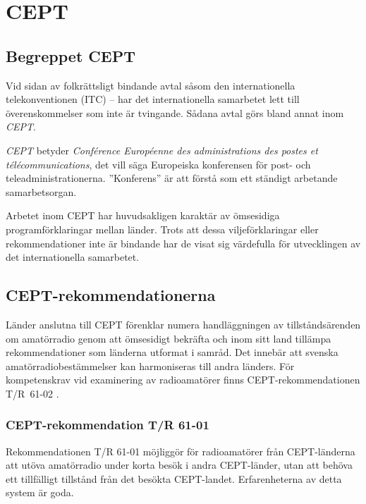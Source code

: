 \section{CEPT}
\label{CEPT}

\subsection{Begreppet CEPT}

Vid sidan av folkrättsligt bindande avtal såsom den internationella
telekonventionen (ITC) -- har det internationella samarbetet lett till
överenskommelser som inte är tvingande.
Sådana avtal görs bland annat inom \emph{CEPT}.

\emph{CEPT} betyder \emph{Conf\'erence Europ\'eenne des administrations des
postes et t\'el\'ecommunications}, det vill säga Europeiska konferensen för
post- och teleadministrationerna.
''Konferens'' är att förstå som ett ständigt arbetande samarbetsorgan.

Arbetet inom CEPT har huvudsakligen karaktär av ömsesidiga programförklaringar
mellan länder.
Trots att dessa viljeförklaringar eller rekommendationer inte är bindande har de
visat sig värdefulla för utvecklingen av det internationella samarbetet.

\subsection{CEPT-rekommendationerna}

Länder anslutna till CEPT förenklar numera handläggningen av
tillståndsärenden om amatörradio genom att ömsesidigt bekräfta och
inom sitt land tillämpa rekommendationer som länderna utformat i
samråd.
Det innebär att svenska amatörradiobestämmelser kan harmoniseras till andra
länders.
För kompetenskrav vid examinering av radioamatörer finns CEPT-rekommendationen
T/R~61-02 \cite{TR6102}.

\subsubsection{CEPT-rekommendation T/R 61-01}

Rekommendationen T/R 61-01 \cite{TR6101} möjliggör för radioamatörer från
CEPT-länderna att utöva amatörradio under korta besök i andra CEPT-länder, utan
att behöva ett tillfälligt tillstånd från det besökta CEPT-landet.
Erfarenheterna av detta system är goda.

